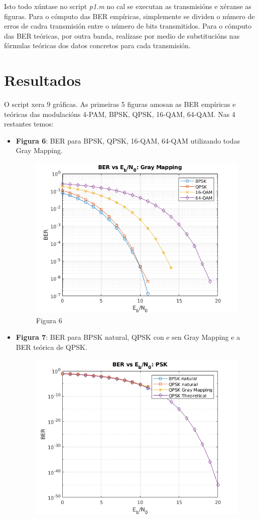 \documentclass[
	10pt, %
	spanish, %
]{fphw}
\begin{document}
Isto todo xúntase no script \textit{p1.m} no cal se executan as transmisións e xéranse as figuras. Para o cómputo das BER empíricas, simplemente se dividen o número de erros de cadra transmisión entre o número de bits transmitidos. Para o cómputo das BER teóricas, por outra banda, realízase por medio de substitucións nas fórmulas teóricas dos datos concretos para cada transmisión.
\section*{Resultados}
O script xera 9 gráficas. As primeiras 5 figuras amosan as BER empíricas e teóricas das modulacións 4-PAM, BPSK, QPSK, 16-QAM, 64-QAM. Nas 4 restantes temos:
\begin{itemize}
\item \textbf{Figura 6}: BER para BPSK, QPSK, 16-QAM, 64-QAM utilizando todas Gray Mapping.
\begin{figure}[htb]
\centering 
\includegraphics{figura6.png}
\caption{Figura 6}
\end{figure}
\item \textbf{Figura 7}: BER para BPSK natural, QPSK con e sen Gray Mapping e a BER teórica de QPSK.
\begin{figure}[htb]
\centering 
\includegraphics{figura7.png}

\end{figure}
\end{itemize}
\end{document}
